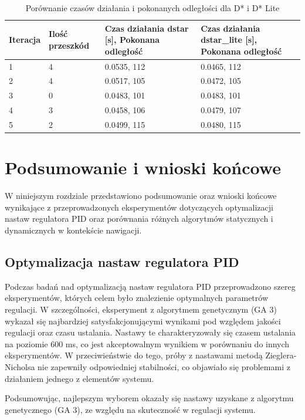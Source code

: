 \documentclass[12pt,twoside]{article}
\begin{document}
\begin{table}[h]
\centering
\begin{tabular}{|p{}|p{}|p{}|p{}|}
\hline
Iteracja & Ilość przeszkód & Czas działania dstar [s], Pokonana odległość & Czas działania dstar\_lite [s], Pokonana odległość \\
\hline
1 & 4 &
0.0535, 112 & 
0.0465, 112 \\
\hline
2 & 4 &
0.0517, 105 & 
0.0472, 105 \\
\hline
3 & 0 &
0.0483, 101 & 
0.0483, 101 \\
\hline
4 & 3 &
0.0458, 106 & 
0.0479, 107 \\
\hline
5 & 2 &
0.0499, 115 & 
0.0480, 115 \\
\hline
\end{tabular}
\caption{Porównanie czasów działania i pokonanych odległości dla D* i D* Lite}
\label{tab:dstar_vs_dstarlite}
\end{table}




\section{Podsumowanie i wnioski końcowe}
W niniejszym rozdziale przedstawiono podsumowanie oraz wnioski końcowe wynikające z przeprowadzonych eksperymentów dotyczących optymalizacji nastaw regulatora PID oraz porównania różnych algorytmów statycznych i dynamicznych w kontekście nawigacji.

\subsection{Optymalizacja nastaw regulatora PID}
Podczas badań nad optymalizacją nastaw regulatora PID przeprowadzono szereg eksperymentów, których celem było znalezienie optymalnych parametrów regulacji. W szczególności, eksperyment z algorytmem genetycznym (GA 3) wykazał się najbardziej satysfakcjonującymi wynikami pod względem jakości regulacji oraz czasu ustalania. Nastawy te charakteryzowały się czasem ustalania na poziomie 600 ms, co jest akceptowalnym wynikiem w porównaniu do innych eksperymentów. W przeciwieństwie do tego, próby z nastawami metodą Zieglera-Nicholsa nie zapewniły odpowiedniej stabilności, co objawiało się problemami z działaniem jednego z elementów systemu.

Podsumowując, najlepszym wyborem okazały się nastawy uzyskane z algorytmu genetycznego (GA 3), ze względu na skuteczność w regulacji systemu.
\end{document}
